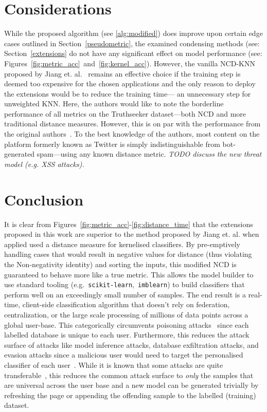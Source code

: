 \documentclass[conference]{IEEEtran}
\newcommand{\cm}[1]{\textit{{\color{blue}#1}}}
\begin{document}
\section{Considerations}
\label{considerations}
While the proposed algorithm (see \ref{alg:modified}) does improve upon certain edge cases outlined in Section~\ref{pseudometric}, the examined condensing methods (see: Section~\ref{extensions} do not have any significant effect on model performance (see: Figures~\ref{fig:metric_acc}~and~\ref{fig:kernel_acc}). 
However, the vanilla NCD-KNN proposed by Jiang et. al.~\cite{jiang2022less} remains an effective choice if the training step is deemed too expensive for the chosen applications and the only reason to deploy the extensions would be to reduce the training time--- an unnecessary step for unweighted KNN. 
Here, the authors would like to note the borderline performance of all metrics on the Truthseeker dataset---both NCD and more traditional distance measures. However, this is on par with the performance from the original authors~\cite{truthseeker}. To the best knowledge of the authors, most content on the platform formerly known as Twitter is simply indistinguishable from bot-generated spam---using any known distance metric.
\cm{TODO discuss the new threat model (e.g. XSS attacks).}

\section{Conclusion}
\label{conclusion}

It is clear from Figures~\ref{fig:metric_acc}-\ref{fig:distance_time} that the extensions proposed in this work are superior to the method proposed by Jiang et. al. when applied used a distance measure for kernelised classifiers. 
By pre-emptively handling cases that would result in negative values for distance (thus violating the Non-negativity identity) and sorting the inputs, this modified NCD is guaranteed to behave more like a true metric. 
This allows the model builder to use standard tooling (e.g.~\texttt{scikit-learn},~\texttt{imblearn}) to build classifiers that perform well on an exceedingly small number of samples. The end result is a real-time, client-side classification algorithm that doesn't rely on federation, centralization, or the large scale processing of millions of data points across a global user-base. 
This categorically circumvents poisoning attacks~\cite{biggio_poisoning_2013} since each labelled database is unique to each user. 
Furthermore, this reduces the attack surface of attacks like model inference attacks, database exfiltration attacks, and evasion attacks since a malicious user would need to target the personalised classifier of each user~\cite{biggio_evasion_2013,deepfool,chakraborty_adversarial_2018}. 
While it is known that some attacks are quite transferable~\cite{wang2021enhancing}, this reduces the common attack surface to \textit{only} the samples that are universal across the user base and a new model can be generated trivially by refreshing the page or appending the offending sample to the labelled (training) dataset. 





\newpage

\end{document}
